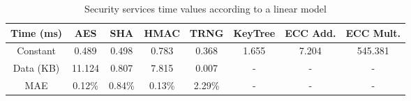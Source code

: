 \begin{table}[h!]
\centering
\def\arraystretch{1.5}
\begin{tabular}{|c|c|c|c|c|c|c|c|}
\hline
Time (ms) & AES    & SHA    & HMAC   & TRNG   & KeyTree & ECC Add. & ECC Mult.	\\ \hline
Constant  & 0.489  & 0.498  & 0.783  & 0.368  & 1.655   & 7.204    & 545.381	\\ \hline
Data (KB) & 11.124 & 0.807  & 7.815  & 0.007  & -       & -	   & -		\\ \hline
MAE       & 0.12\% & 0.84\% & 0.13\% & 2.29\% & -       & -	   & -		\\ \hline
\end{tabular}
\caption{Security services time values according to a linear model}
\label{tab:core-model}
\end{table}
